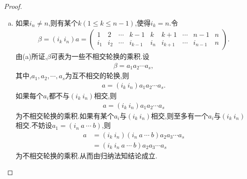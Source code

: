 \documentclass[../../main.tex]{subfiles}%
\begin{document}
\begin{proof}
\begin{enumerate}[(1)]
\begin{enumerate}[(a)]
\item 如果$i_n \neq n$,则有某个$k(1\leqslant k \leqslant n-1)$,使得$i_k = n$.令
\begin{align*}
\beta = (i_k\ i_n)a = \begin{pmatrix} 1 & 2 & \cdots & k-1 & k & k+1 & \cdots & n-1 & n \\ i_1 & i_2 & \cdots & i_{k-1} & i_n & i_{k+1} & \cdots & i_{n-1} & n \end{pmatrix}.
\end{align*}
由(a)所证,$\beta$可表为一些不相交轮换的乘积.设
\begin{align*}
\beta = a_1a_2\cdots a_s,
\end{align*}
其中,$a_1,a_2,\cdots,a_s$为互不相交的轮换,则
\begin{align*}
a = (i_k\ i_n)a_1a_2\cdots a_s.
\end{align*}
如果每个$a_i$都不与$(i_k\ i_n)$相交,则
\begin{align*}
a = (i_k\ i_n)a_1a_2\cdots a_s
\end{align*}
为不相交轮换的乘积.如果有某个$a_i$与$(i_k\ i_n)$相交,则至多有一个$a_i$与$(i_k\ i_n)$相交.不妨设$a_1=(i_n\ a\ \cdots\ b)$,则
\begin{align*}
a &= (i_k\ i_n)(i_n\ a\ \cdots\ b)a_2a_3\cdots a_s \\
&= (i_k\ i_n\ a\ \cdots\ b)a_2a_3\cdots a_s
\end{align*}
为不相交轮换的乘积.从而由归纳法知结论成立.
\end{enumerate}


\end{enumerate}
\end{proof}
\end{document}
